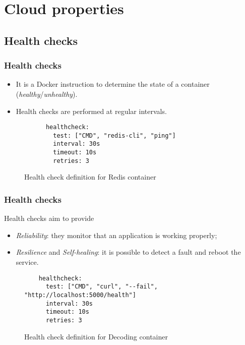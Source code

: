 \section{Cloud properties}

\subsection{Health checks}
\begin{frame}[containsverbatim]
	\frametitle{Health checks}
	
	\begin{itemize}
		\item It is a Docker instruction to determine the state of a container (\emph{healthy}/\emph{unhealthy}).
		\item Health checks are performed at regular intervals.
	\end{itemize}
	
	\begin{figure}[h]
		\begin{verbatim}
      healthcheck:
        test: ["CMD", "redis-cli", "ping"]
        interval: 30s
        timeout: 10s
        retries: 3
		\end{verbatim}
		\caption{Health check definition for Redis container}
	\end{figure}
\end{frame}

\begin{frame}[containsverbatim]
	\frametitle{Health checks}
	
	Health checks aim to provide
	\begin{itemize}
		\item \emph{Reliability}: they monitor that an application is working properly;
		\item \emph{Resilience} and \emph{Self-healing}: it is possible to detect a fault and reboot the service.
	\end{itemize}
	
	\begin{figure}[h]
		\begin{verbatim}
    healthcheck:
      test: ["CMD", "curl", "--fail", "http://localhost:5000/health"]
      interval: 30s
      timeout: 10s
      retries: 3
		\end{verbatim}
		\caption{Health check definition for Decoding container}
	\end{figure}
\end{frame}

